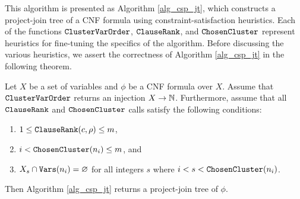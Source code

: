 This algorithm is presented as Algorithm \ref{alg_csp_jt}, which constructs a project-join tree of a CNF formula using constraint-satisfaction heuristics.
Each of the functions $\texttt{\upshape ClusterVarOrder}$, $\texttt{\upshape ClauseRank}$, and $\texttt{\upshape ChosenCluster}$ represent heuristics for fine-tuning the specifics of the algorithm.
Before discussing the various heuristics, we assert the correctness of Algorithm \ref{alg_csp_jt} in the following theorem.
\begin{theorem}
\label{thm_csp_jt}
    Let $X$ be a set of variables and $\phi$ be a CNF formula over $X$.
    Assume that $\texttt{\upshape ClusterVarOrder}$ returns an injection $X \to \mathbb{N}$.
    Furthermore, assume that all $\texttt{\upshape ClauseRank}$ and $\texttt{\upshape ChosenCluster}$ calls satisfy the following conditions:
    \begin{enumerate}[ref=\arabic*]
        \item $1 \le \texttt{\upshape ClauseRank}(c, \rho) \le m$, \label{cond1}
        \item $i < \texttt{\upshape ChosenCluster}(n_i) \le m$, and \label{cond2}
        \item $X_s \cap \texttt{\upshape Vars}(n_i) = \varnothing$ for all integers $s$ where $i < s < \texttt{\upshape ChosenCluster}(n_i)$. \label{cond3}
    \end{enumerate}
    Then Algorithm \ref{alg_csp_jt} returns a project-join tree of $\phi$.
\end{theorem}
